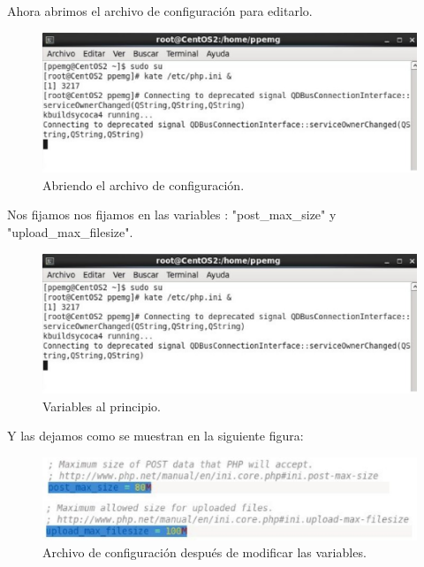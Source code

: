 Ahora abrimos el archivo de configuración para editarlo.

\begin{figure}[H]
\begin{center}
\includegraphics[scale=0.4]{Imagenes/sub16-2.eps}
\caption{Abriendo el archivo de configuración.}
\end{center}
\end{figure}

Nos fijamos nos fijamos en las variables : "post\_max\_size" y "upload\_max\_filesize".

\begin{figure}[H]
\begin{center}
\includegraphics[scale=0.4]{Imagenes/sub16-3.eps}
\caption{Variables al principio.}
\end{center}
\end{figure}

Y las dejamos como se  muestran en la siguiente figura:

\begin{figure}[H]
\begin{center}
\includegraphics[scale=0.4]{Imagenes/sub16-4.eps}
\caption{Archivo de configuración después de modificar las variables.}
\end{center}
\end{figure}

